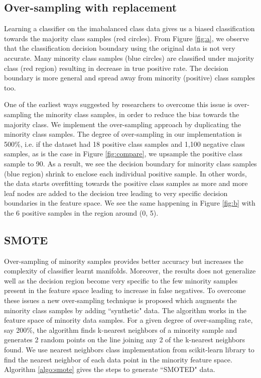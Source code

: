 \documentclass[10pt,journal,compsoc]{IEEEtran}
\begin{document}
\subsection{Over-sampling with replacement}
Learning a classifier on the imabalanced class data gives us a biased classification towards the majority class samples (red circles).
From Figure \ref{fig:a}, we observe that the classification decision boundary using the original data is not very accurate. 
Many minority class samples (blue circles) are classified under majority class (red region) resulting in decrease in true positive rate. 
The decision boundary is more general and spread away from minority (positive) class samples too.

One of the earliest ways suggested by researchers to overcome this issue is over-sampling the minority class samples, in order to reduce the bias towards the majority class.
We implement the over-sampling approach by duplicating the minority class samples.
The degree of over-sampling in our implementation is 500\%, i.e. if the dataset had 18 positive class samples and 1,100 negative class samples, as is the case in Figure \ref{fig:compare}, we upsample the positive class sample to 90.
As a result, we see the decision boundary for minority class samples (blue region) shrink to enclose each individual positive sample.
In other words, the data starts overfitting towards the positive class samples as more and more leaf nodes are added to the decision tree leading to very specific decision boundaries in the feature space.
We see the same happening in Figure \ref{fig:b} with the 6 positive samples in the region around (0, 5).

\subsection{SMOTE}
Over-sampling of minority samples provides better accuracy but increases the complexity of classifier learnt manifolds. 
Moreover, the results does not generalize well as the decision region become very specific to the few minority samples present in the feature space leading to increase in false negatives.
To overcome these issues a new over-sampling technique is proposed which augments the minority class samples by adding ``synthetic" data.
The algorithm works in the feature space of minority data samples.
For a given degree of over-sampling rate, say 200\%, the algorithm finds k-nearest neighbors of a minority sample and generates 2 random points on the line joining any 2 of the k-nearest neighbors found.
We use nearest neighbors class implementation from scikit-learn library to find the nearest neighbor of each data point in the minority feature space.
Algorithm \ref{algo:smote} gives the steps to generate ``SMOTED" data.
\end{document}
